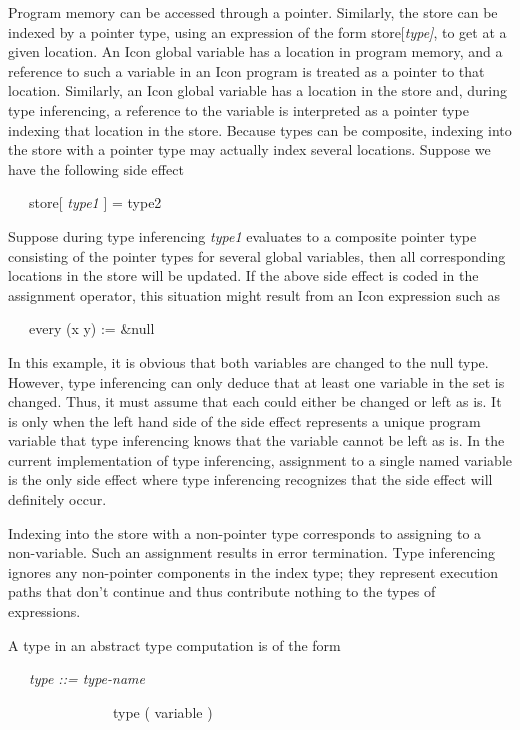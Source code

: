 Program memory can be accessed through a pointer. Similarly, the store
can be indexed by a pointer type, using an expression of the form
store[\textit{type]}, to get at a given location. An Icon global
variable has a location in program memory, and a reference to such a
variable in an Icon program is treated as a pointer to that location.
Similarly, an Icon global variable has a location in the store and,
during type inferencing, a reference to the variable is interpreted as
a pointer type indexing that location in the store. Because types can
be composite, indexing into the store with a pointer type may actually
index several locations. Suppose we have the following side effect

{\ttfamily\mdseries
\ \ \ store[ \textit{type1} ] = type2}


Suppose during type inferencing \textit{type1} evaluates to a
composite pointer type consisting of the pointer types for several
global variables, then all corresponding locations in the store will
be updated. If the above side effect is coded in the assignment
operator, this situation might result from an Icon expression such as

{\ttfamily\mdseries
\ \ \ every (x {\textbar} y) := \&null}


In this example, it is obvious that both variables are changed to the
null type. However, type inferencing can only deduce that at least one
variable in the set is changed. Thus, it must assume that each could
either be changed or left as is. It is only when the left hand side of
the side effect represents a unique program variable that type
inferencing knows that the variable cannot be left as is. In the
current implementation of type inferencing, assignment to a single
named variable is the only side effect where type inferencing
recognizes that the side effect will definitely occur.

Indexing into the store with a non-pointer type corresponds to
assigning to a non-variable. Such an assignment results in error
termination. Type inferencing ignores any non-pointer components in
the index type; they represent execution paths that don't continue and
thus contribute nothing to the types of expressions.

A type in an abstract type computation is of the form 

{\ttfamily\mdseries
\ \ \ \textit{type ::= type-name} {\textbar}}

{\ttfamily\mdseries
\ \ \ \ \ \ \ \ \ \ \ \ \ \ \ type ( variable ) {\textbar}}

